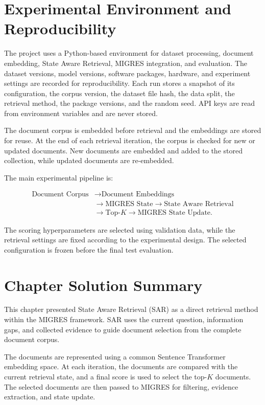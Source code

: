 \documentclass[12pt,a4paper]{report}
\begin{document}
\section{Experimental Environment and Reproducibility}

The project uses a Python-based environment for dataset processing,
document embedding, State Aware Retrieval, MIGRES integration, and
evaluation. The dataset versions, model versions, software packages,
hardware, and experiment settings are recorded for reproducibility. Each run stores a snapshot of its configuration, the corpus version, the dataset file hash, the data split, the retrieval method, the package versions, and the random seed. API keys are read from environment variables and are never stored.

The document corpus is embedded before retrieval and the embeddings are
stored for reuse. At the end of each retrieval iteration, the corpus is
checked for new or updated documents. New documents are embedded and
added to the stored collection, while updated documents are re-embedded.

The main experimental pipeline is:

\[
\begin{aligned}
\text{Document Corpus}
&\rightarrow \text{Document Embeddings}\\
&\rightarrow \text{MIGRES State}
\rightarrow \text{State Aware Retrieval}\\
&\rightarrow \text{Top-}K
\rightarrow \text{MIGRES State Update}.
\end{aligned}
\]

The scoring hyperparameters are selected using validation data, while
the retrieval settings are fixed according to the experimental design.
The selected configuration is frozen before the final test evaluation.

\section{Chapter Solution Summary}

This chapter presented State Aware Retrieval (SAR) as a direct retrieval
method within the MIGRES framework. SAR uses the current question,
information gaps, and collected evidence to guide document selection
from the complete document corpus.

The documents are represented using a common Sentence Transformer
embedding space. At each iteration, the documents are compared with the
current retrieval state, and a final score is used to select the
top-$K$ documents. The selected documents are then passed to MIGRES for
filtering, evidence extraction, and state update.
\end{document}
